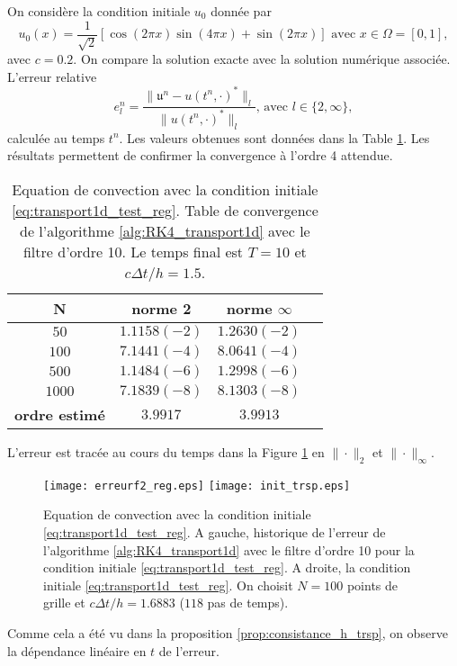 On considère la condition initiale $u_0$ donnée par 
\begin{equation}
u_0(x) = \dfrac{1}{\sqrt{2}} \left[ \cos (2 \pi x) \sin (4 \pi x) + \sin ( 2 \pi x ) \right] \text{ avec } x \in \Omega = [0,1],
\label{eq:transport1d_test_reg}
\end{equation}
avec $c=0.2$. On compare la solution exacte avec la solution numérique associée. L'erreur relative
\begin{equation}
e_l^n = \dfrac{\| \mathfrak{u}^n - u(t^n,\cdot)^* \|_l}{\| u(t^n, \cdot)^* \|_l} \text{, avec } l \in \lbrace 2, \infty \rbrace,
\end{equation}
calculée au temps $t^n$. Les valeurs obtenues sont données dans la Table \ref{tab:rate_transport1d_test_reg}. Les résultats permettent de confirmer la convergence à l'ordre 4 attendue.
\begin{table}[htbp]
\begin{center}
\begin{tabular}{|c||c|c|c|}
\hline
\textbf{N}  & \textbf{norme 2} & \textbf{norme $\infty$} \\
\hline
\hline
$50$   & $1.1158(-2)$  & $1.2630(-2)$  \\
$100$  & $7.1441(-4)$  & $8.0641(-4)$  \\
$500$  & $1.1484(-6)$  & $1.2998(-6)$  \\
$1000$ & $7.1839(-8)$  & $8.1303(-8)$  \\
\hline 
\hline
\textbf{ordre estimé}& $3.9917$ & $3.9913$\\
\hline
\end{tabular}
\end{center}
\caption{Equation de convection avec la condition initiale \eqref{eq:transport1d_test_reg}. Table de convergence de l'algorithme \ref{alg:RK4_transport1d} avec le filtre d'ordre 10. Le temps final est $T=10$ et $c \Delta t/h=1.5$.}
\label{tab:rate_transport1d_test_reg}
\end{table} 
L'erreur est tracée au cours du temps dans la Figure \ref{fig:transport1d_test_reg} en $\| \cdot \|_2$ et $\| \cdot \|_{\infty}$.
\begin{figure}[htbp]
\begin{center}
\texttt{[image: erreurf2\_reg.eps]}
\texttt{[image: init\_trsp.eps]}
\end{center}
\caption{Equation de convection avec la condition initiale \eqref{eq:transport1d_test_reg}. A gauche, historique de l'erreur de l'algorithme \ref{alg:RK4_transport1d} avec le filtre d'ordre 10 pour la condition initiale \eqref{eq:transport1d_test_reg}. A droite, la condition initiale \eqref{eq:transport1d_test_reg}. On choisit $N=100$ points de grille et $c \Delta t/h = 1.6883$ ($118$ pas de temps).}
\label{fig:transport1d_test_reg}
\end{figure}
Comme cela a été vu dans la proposition \ref{prop:consistance_h_trsp}, on observe la dépendance linéaire en $t$ de l'erreur.








